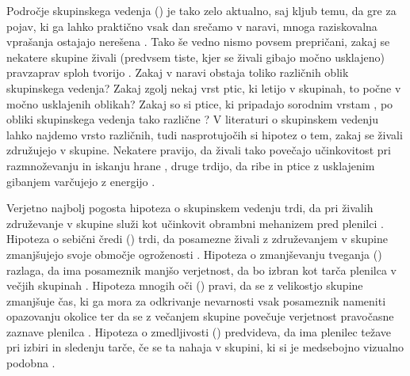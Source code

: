 \begin{razsirjeniPovzetek}
Področje skupinskega vedenja () je tako zelo aktualno, saj kljub temu, da gre za pojav, ki ga lahko praktično vsak dan srečamo v naravi, mnoga raziskovalna vprašanja ostajajo nerešena \cite{krause2002living,lebarbajec2009organized,sumpter2006principles}. Tako še vedno nismo povsem prepričani, zakaj se nekatere skupine živali (predvsem tiste, kjer se živali gibajo močno usklajeno) pravzaprav sploh tvorijo \cite{lebarbajec2009organized}. Zakaj v naravi obstaja toliko različnih oblik skupinskega vedenja? Zakaj zgolj nekaj vrst ptic, ki letijo v skupinah, to počne v močno usklajenih oblikah? Zakaj so si ptice, ki pripadajo sorodnim vrstam \cite{jarvis2014wholegenome}, po obliki skupinskega vedenja tako različne \cite{lebarbajec2009organized}? V literaturi o skupinskem vedenju lahko najdemo vrsto različnih, tudi nasprotujočih si hipotez o tem, zakaj se živali združujejo v skupine. Nekatere pravijo, da živali tako povečajo učinkovitost pri razmnoževanju in iskanju hrane \cite{krebs1994behavioural}, druge trdijo, da ribe in ptice z usklajenim gibanjem varčujejo z energijo \cite{hemelrijk2014increased,marras2015fish,portugal2014upwash}.

Verjetno najbolj pogosta hipoteza o skupinskem vedenju trdi, da pri živalih združevanje v skupine služi kot učinkovit obrambni mehanizem pred plenilci \cite{cresswell2011predicting,hart2005predator,krause2002living,larsson2012why,lebarbajec2009organized,nishimura2002predator,pavlov2000patterns}. Hipoteza o sebični čredi () trdi, da posamezne živali z združevanjem v skupine zmanjšujejo svoje območje ogroženosti \cite{hamilton1971geometry,viscido2001response}. Hipoteza o zmanjševanju tveganja () razlaga, da ima posameznik manjšo verjetnost, da bo izbran kot tarča plenilca v večjih skupinah \cite{tosh2011conditions}. Hipoteza mnogih oči () pravi, da se z velikostjo skupine zmanjšuje čas, ki ga mora za odkrivanje nevarnosti vsak posameznik nameniti opazovanju okolice \cite{elgar1989predator,haley2014exploring,ruxton2008application,sadedin1998influence} ter da se z večanjem skupine povečuje verjetnost pravočasne zaznave plenilca \cite{galton1871gregariousness}. Hipoteza o zmedljivosti () predvideva, da ima plenilec težave pri izbiri in sledenju tarče, če se ta nahaja v skupini, ki si je medsebojno vizualno podobna \cite{demsar2015simulating,kunz2006prey,nishimura2002predator,olson2013predator,olson2016evolution,zheng2005behavior}.


\end{razsirjeniPovzetek}
